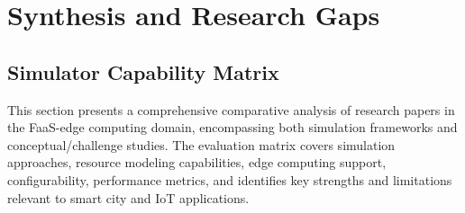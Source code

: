 \section{Synthesis and Research Gaps}

\subsection{Simulator Capability Matrix}

This section presents a comprehensive comparative analysis of research papers in the FaaS-edge computing domain, encompassing both simulation frameworks and conceptual/challenge studies. The evaluation matrix covers simulation approaches, resource modeling capabilities, edge computing support, configurability, performance metrics, and identifies key strengths and limitations relevant to smart city and IoT applications.


